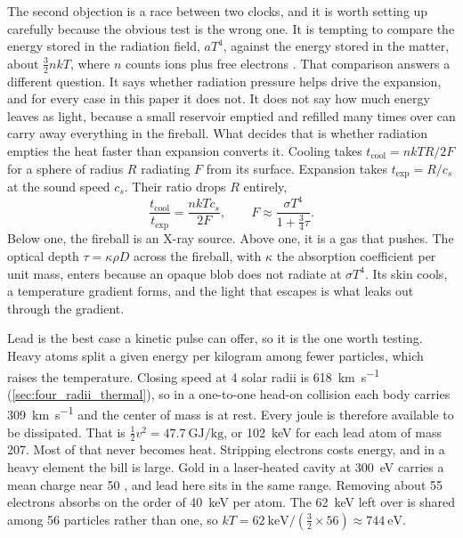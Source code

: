 \documentclass{article}
\begin{document}
The second objection is a race between two clocks, and it is worth setting up carefully because the obvious test is the wrong one. It is tempting to compare the energy stored in the radiation field, $aT^4$, against the energy stored in the matter, about $\tfrac{3}{2}nkT$, where $n$ counts ions plus free electrons \cite{zeldovich_raizer}. That comparison answers a different question. It says whether radiation pressure helps drive the expansion, and for every case in this paper it does not. It does not say how much energy leaves as light, because a small reservoir emptied and refilled many times over can carry away everything in the fireball. What decides that is whether radiation empties the heat faster than expansion converts it. Cooling takes $t_{\mathrm{cool}} = nkTR/2F$ for a sphere of radius $R$ radiating $F$ from its surface. Expansion takes $t_{\mathrm{exp}} = R/c_s$ at the sound speed $c_s$. Their ratio drops $R$ entirely,
\begin{equation}\label{eq:cooling_race}
\frac{t_{\mathrm{cool}}}{t_{\mathrm{exp}}} = \frac{nkTc_s}{2F}, \qquad F \approx \frac{\sigma T^4}{1+\tfrac{3}{4}\tau}.
\end{equation}
Below one, the fireball is an X-ray source. Above one, it is a gas that pushes. The optical depth $\tau = \kappa\rho D$ across the fireball, with $\kappa$ the absorption coefficient per unit mass, enters because an opaque blob does not radiate at $\sigma T^4$. Its skin cools, a temperature gradient forms, and the light that escapes is what leaks out through the gradient.

Lead is the best case a kinetic pulse can offer, so it is the one worth testing. Heavy atoms split a given energy per kilogram among fewer particles, which raises the temperature. Closing speed at 4 solar radii is \SI{618}{\kilo\meter\per\second} (\autoref{sec:four_radii_thermal}), so in a one-to-one head-on collision each body carries \SI{309}{\kilo\meter\per\second} and the center of mass is at rest. Every joule is therefore available to be dissipated. That is $\tfrac{1}{2}v^2 = \SI{47.7}{\giga\joule\per\kilogram}$, or \SI{102}{\kilo\electronvolt} for each lead atom of mass 207. Most of that never becomes heat. Stripping electrons costs energy, and in a heavy element the bill is large. Gold in a laser-heated cavity at \SI{300}{\electronvolt} carries a mean charge near 50 \cite{lindl1995}, and lead here sits in the same range. Removing about 55 electrons absorbs on the order of \SI{40}{\kilo\electronvolt} per atom. The \SI{62}{\kilo\electronvolt} left over is shared among 56 particles rather than one, so $kT = \SI{62}{\kilo\electronvolt}/(\tfrac{3}{2}\times 56) \approx \SI{744}{\electronvolt}$.
\end{document}

